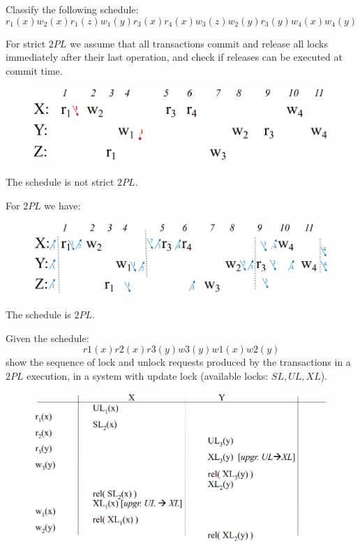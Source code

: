 \documentclass[12pt, a4paper]{report}
\newtheorem[style=M,bodystyle=\normalfont]{theorem}{Theorem}
\newtheorem[style=M,bodystyle=\normalfont]{corollary}{Corollary}
\newtheorem[style=M,bodystyle=\normalfont]{lemma}{Lemma}
\newtheorem[style=M,bodystyle=\normalfont]{definition}{Definition}
\begin{document}
    \begin{Exercise}[label=1]
        Classify the following schedule: 
        \[r_1(x) w_2(x) r_1(z) w_1(y) r_3(x) r_4(x) w_3(z) w_2(y) r_3(y) w_4(x) w_4(y)\]
    \end{Exercise}
    \begin{Answer}[ref=1]
        For strict $2PL$ we assume that all transactions commit and release all locks immediately after their last operation, and check if releases can be executed at commit time.
        \begin{figure}[H]
            \centering
            \includegraphics[width=1\linewidth]{images/2PL7.png}
        \end{figure}
        The schedule is not strict $2PL$.

        For $2PL$ we have: 
        \begin{figure}[H]
            \centering
            \includegraphics[width=1\linewidth]{images/2PL8.png}
        \end{figure}
        The schedule is $2PL$. 
    \end{Answer}

    \newpage

    \begin{Exercise}[label=1]
        Given the schedule:
        \[r1(x) r2(x) r3(y) w3(y) w1(x) w2(y)\]
        show the sequence of lock and unlock requests produced by the transactions in a $2PL$ execution, in a system with update lock (available locks: $SL, UL, XL$).
    \end{Exercise}
    \begin{Answer}[ref=1]
        \begin{figure}[H]
            \centering
            \includegraphics[width=1\linewidth]{images/update.png}
        \end{figure}
    \end{Answer}
\end{document}
